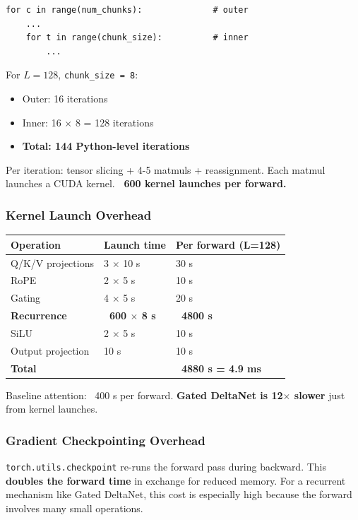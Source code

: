\begin{lstlisting}
for c in range(num_chunks):              # outer
    ...
    for t in range(chunk_size):          # inner
        ...
\end{lstlisting}

For $L = 128$, \texttt{chunk\_size = 8}:
\begin{itemize}
\item Outer: 16 iterations
\item Inner: 16 $\times$ 8 = 128 iterations
\item \textbf{Total: 144 Python-level iterations}

\end{itemize}
Per iteration: tensor slicing + 4-5 matmuls + reassignment. Each matmul 
launches a CUDA kernel. \textbf{~600 kernel launches per forward.}

\subsubsection{Kernel Launch Overhead}

\begin{table}[H]
\centering
\small
\begin{tabular}{lll}
\toprule
\textbf{Operation} & \textbf{Launch time} & \textbf{Per forward (L=128)} \\
\midrule
Q/K/V projections & 3 $\times$ 10  s & 30  s \\
RoPE & 2 $\times$ 5  s & 10  s \\
Gating & 4 $\times$ 5  s & 20  s \\
\textbf{Recurrence} & \textbf{~600 $\times$ 8  s} & \textbf{~4800  s} \\
SiLU & 2 $\times$ 5  s & 10  s \\
Output projection & 10  s & 10  s \\
\textbf{Total} &  & \textbf{~4880  s = 4.9 ms} \\
\bottomrule
\end{tabular}
\end{table}

Baseline attention: ~400  s per forward. \textbf{Gated DeltaNet is 12$\times$ slower} 
just from kernel launches.

\subsubsection{Gradient Checkpointing Overhead}

\texttt{torch.utils.checkpoint} re-runs the forward pass during backward. This 
\textbf{doubles the forward time} in exchange for reduced memory. For a 
recurrent mechanism like Gated DeltaNet, this cost is especially high 
because the forward involves many small operations.

